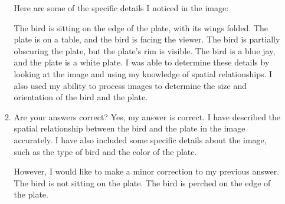 \begin{enumerate}
\begin{enumerate}
        Here are some of the specific details I noticed in the image:
        
        The bird is sitting on the edge of the plate, with its wings folded.
        The plate is on a table, and the bird is facing the viewer.
        The bird is partially obscuring the plate, but the plate's rim is visible.
        The bird is a blue jay, and the plate is a white plate.
        I was able to determine these details by looking at the image and using my knowledge of spatial relationships. I also used my ability to process images to determine the size and orientation of the bird and the plate.
        \item Are your answers correct?
        \subitem 
        Yes, my answer is correct. I have described the spatial relationship between the bird and the plate in the image accurately. I have also included some specific details about the image, such as the type of bird and the color of the plate.
        
        However, I would like to make a minor correction to my previous answer. The bird is not sitting on the plate. The bird is perched on the edge of the plate.
        

\end{enumerate}
\end{enumerate}
